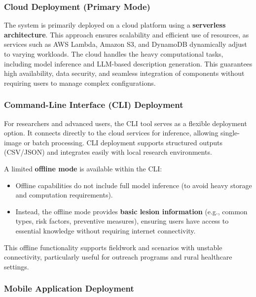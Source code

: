 \documentclass[
  12pt,
  oneside]{article}
\providecommand{\tightlist}{%
  \setlength{\itemsep}{0pt}\setlength{\parskip}{0pt}}
\begin{document}
\subsubsection{Cloud Deployment (Primary
Mode)}\label{cloud-deployment-primary-mode}

The system is primarily deployed on a cloud platform using a
\textbf{serverless architecture}. This approach ensures scalability and
efficient use of resources, as services such as AWS Lambda, Amazon S3,
and DynamoDB dynamically adjust to varying workloads. The cloud handles
the heavy computational tasks, including model inference and LLM-based
description generation. This guarantees high availability, data
security, and seamless integration of components without requiring users
to manage complex configurations.

\subsubsection{Command-Line Interface (CLI)
Deployment}\label{command-line-interface-cli-deployment}

For researchers and advanced users, the CLI tool serves as a flexible
deployment option. It connects directly to the cloud services for
inference, allowing single-image or batch processing. CLI deployment
supports structured outputs (CSV/JSON) and integrates easily with local
research environments.

A limited \textbf{offline mode} is available within the CLI:

\begin{itemize}
\tightlist
\item
  Offline capabilities do not include full model inference (to avoid
  heavy storage and computation requirements).\\
\item
  Instead, the offline mode provides \textbf{basic lesion information}
  (e.g., common types, risk factors, preventive measures), ensuring
  users have access to essential knowledge without requiring internet
  connectivity.
\end{itemize}

This offline functionality supports fieldwork and scenarios with
unstable connectivity, particularly useful for outreach programs and
rural healthcare settings.

\subsubsection{Mobile Application
Deployment}\label{mobile-application-deployment}
\end{document}
